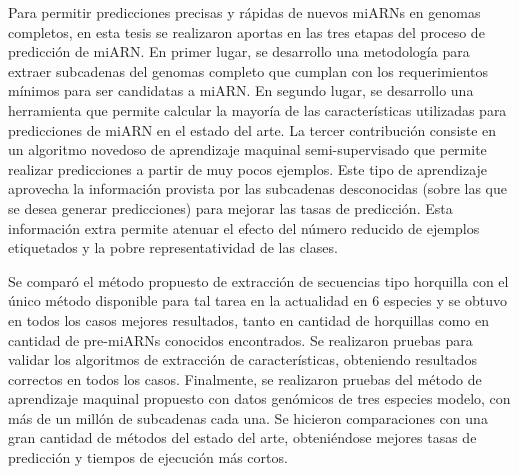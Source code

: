 Para permitir predicciones precisas y rápidas de nuevos miARNs en genomas completos, en esta tesis se realizaron aportas en las tres etapas del proceso de predicción de miARN.
En primer lugar, se desarrollo una metodología para extraer subcadenas del genomas completo que cumplan con los requerimientos mínimos para ser candidatas a
miARN. En segundo lugar, se desarrollo una herramienta que permite calcular la mayoría de las características utilizadas para predicciones de miARN en el estado
del arte. La tercer contribución consiste en un algoritmo novedoso de aprendizaje maquinal semi-supervisado que permite realizar predicciones a partir de muy pocos
ejemplos. Este tipo de aprendizaje aprovecha la información provista por las subcadenas desconocidas (sobre las que se desea generar predicciones)
para mejorar las tasas de predicción. Esta información extra permite atenuar el efecto del número reducido de ejemplos etiquetados y la pobre
representatividad de las clases.

Se comparó el método propuesto de extracción de secuencias tipo horquilla con el único método disponible para tal tarea en la actualidad en 6 especies y se obtuvo
en todos los casos mejores resultados, tanto en cantidad de horquillas como en cantidad de pre-miARNs conocidos encontrados. Se realizaron pruebas para validar los
algoritmos de extracción de características, obteniendo resultados correctos en todos los casos. Finalmente, se realizaron pruebas del método de aprendizaje maquinal
propuesto con datos genómicos de tres especies modelo, con más de un millón de subcadenas cada una. Se hicieron comparaciones con una gran cantidad de métodos del estado del arte,
obteniéndose mejores tasas de predicción y tiempos de ejecución más cortos.
